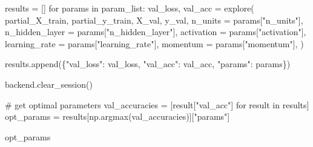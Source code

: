 \documentclass[
  letterpaper,
  DIV=11,
  numbers=noendperiod]{scrreprt}
\newenvironment{Shaded}{\begin{snugshade}}{\end{snugshade}}
\newcommand{\CommentTok}[1]{\textcolor[rgb]{0.37,0.37,0.37}{#1}}
\newcommand{\ControlFlowTok}[1]{\textcolor[rgb]{0.00,0.23,0.31}{#1}}
\newcommand{\KeywordTok}[1]{\textcolor[rgb]{0.00,0.23,0.31}{#1}}
\newcommand{\NormalTok}[1]{\textcolor[rgb]{0.00,0.23,0.31}{#1}}
\newcommand{\OperatorTok}[1]{\textcolor[rgb]{0.37,0.37,0.37}{#1}}
\newcommand{\StringTok}[1]{\textcolor[rgb]{0.13,0.47,0.30}{#1}}
\begin{document}
\begin{Shaded}
\begin{Highlighting}[]
\NormalTok{results }\OperatorTok{=}\NormalTok{ []}
\ControlFlowTok{for}\NormalTok{ params }\KeywordTok{in}\NormalTok{ param\_list:}
\NormalTok{    val\_loss, val\_acc }\OperatorTok{=}\NormalTok{ explore(}
\NormalTok{        partial\_X\_train, }
\NormalTok{        partial\_y\_train,}
\NormalTok{        X\_val,}
\NormalTok{        y\_val,}
\NormalTok{        n\_units }\OperatorTok{=}\NormalTok{ params[}\StringTok{"n\_units"}\NormalTok{],}
\NormalTok{        n\_hidden\_layer }\OperatorTok{=}\NormalTok{ params[}\StringTok{"n\_hidden\_layer"}\NormalTok{],}
\NormalTok{        activation }\OperatorTok{=}\NormalTok{ params[}\StringTok{"activation"}\NormalTok{],}
\NormalTok{        learning\_rate }\OperatorTok{=}\NormalTok{ params[}\StringTok{"learning\_rate"}\NormalTok{],}
\NormalTok{        momentum }\OperatorTok{=}\NormalTok{ params[}\StringTok{"momentum"}\NormalTok{],}
\NormalTok{    )}
    
\NormalTok{    results.append(\{}\StringTok{"val\_loss"}\NormalTok{: val\_loss,}
                    \StringTok{"val\_acc"}\NormalTok{: val\_acc,}
                    \StringTok{"params"}\NormalTok{: params\})}

\NormalTok{    backend.clear\_session()}
\end{Highlighting}
\end{Shaded}

\begin{Shaded}
\begin{Highlighting}[]
\CommentTok{\# get optimal parameters}
\NormalTok{val\_accuracies }\OperatorTok{=}\NormalTok{ [result[}\StringTok{"val\_acc"}\NormalTok{] }\ControlFlowTok{for}\NormalTok{ result }\KeywordTok{in}\NormalTok{ results]}
\NormalTok{opt\_params     }\OperatorTok{=}\NormalTok{ results[np.argmax(val\_accuracies)][}\StringTok{"params"}\NormalTok{]}

\NormalTok{opt\_params}
\end{Highlighting}
\end{Shaded}
\end{document}
